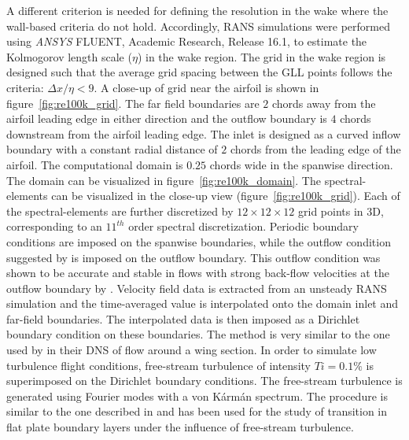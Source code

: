 \documentclass[twocolumn,10pt]{tsfp}
\begin{document}
A different criterion is needed for defining the resolution in the wake where the wall-based criteria do not hold. Accordingly, RANS simulations were performed using \textit{ANSYS}\textsuperscript{\textregistered} FLUENT, Academic Research, Release 16.1, to estimate the Kolmogorov length scale ($\eta$) in the wake region. The grid in the wake region is designed such that the average grid spacing between the GLL points follows the criteria: $\Delta x/\eta < 9$. A close-up of grid near the airfoil is shown in figure~\ref{fig:re100k_grid}. The far field boundaries are $2$ chords away from the airfoil leading edge in either direction and the outflow boundary is $4$ chords downstream from the airfoil leading edge. The inlet is designed as a curved inflow boundary with a constant radial distance of $2$ chords from the leading edge of the airfoil. The computational domain is $0.25$ chords wide in the spanwise direction. The domain can be visualized in figure~\ref{fig:re100k_domain}. The spectral-elements can be visualized in the close-up view (figure~\ref{fig:re100k_grid}). Each of the spectral-elements are further discretized by $12\times12\times12$ grid points in 3D, corresponding to an $11^{th}$ order spectral discretization. Periodic boundary conditions are imposed on the spanwise boundaries, while the outflow condition suggested by \cite{dong2014} is imposed on the outflow boundary. This outflow condition was shown to be accurate and stable in flows with strong back-flow velocities at the outflow boundary by \cite{dong2014}. Velocity field data is extracted from an unsteady RANS simulation and the time-averaged value is interpolated onto the domain inlet and far-field boundaries. The interpolated data is then imposed as a Dirichlet boundary condition on these boundaries. The method is very similar to the one used by \cite{hosseini16} in their DNS of flow around a wing section. In order to simulate low turbulence flight conditions, free-stream turbulence of intensity $Ti=0.1\%$ is superimposed on the Dirichlet boundary conditions. The free-stream turbulence is generated using Fourier modes with a von K\'arm\'an spectrum. The procedure is similar to the one described in \cite{brandt04} and has been used for the study of transition in flat plate boundary layers under the influence of free-stream turbulence.
\end{document}
